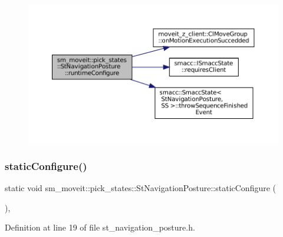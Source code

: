 \begin{figure}[H]
\begin{center}
\leavevmode
\includegraphics[width=350pt]{structsm__moveit_1_1pick__states_1_1StNavigationPosture_add5f3d828cb52f6320e5d60fbbf7dec6_cgraph}
\end{center}
\end{figure}
\mbox{\label{structsm__moveit_1_1pick__states_1_1StNavigationPosture_a6d87dbbde4965e2f4c8606402c523a3d}} 
\subsubsection{\texorpdfstring{static\+Configure()}{staticConfigure()}}
{\footnotesize\ttfamily static void sm\+\_\+moveit\+::pick\+\_\+states\+::\+St\+Navigation\+Posture\+::static\+Configure (\begin{DoxyParamCaption}{ }\end{DoxyParamCaption})\hspace{0.3cm}{\ttfamily [inline]}, {\ttfamily [static]}}



Definition at line 19 of file st\+\_\+navigation\+\_\+posture.\+h.


